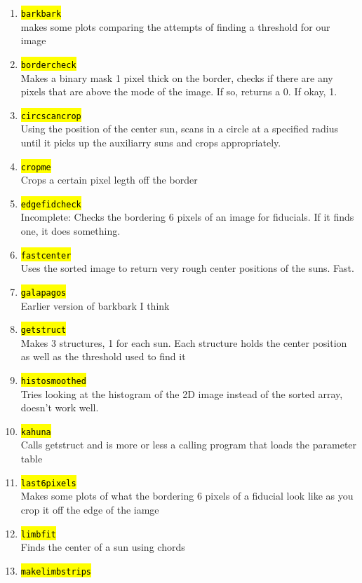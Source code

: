 \documentclass[10pt]{article}
\begin{document}
\begin{enumerate}
	\item \hl{\texttt{barkbark}}\\
		makes some plots comparing the attempts of finding a threshold for our image
	\item \hl{\texttt{bordercheck}}\\
		Makes a binary mask 1 pixel thick on the border, checks if there are any pixels that are above the mode of the image. If so, returns a 0. If okay, 1.
	\item \hl{\texttt{circscancrop}}\\
		Using the position of the center sun, scans in a circle at a specified radius until it picks up the auxiliarry suns and crops appropriately.
	\item \hl{\texttt{cropme}}\\
		Crops a certain pixel legth off the border
	\item \hl{\texttt{edgefidcheck}}\\
		Incomplete: Checks the bordering 6 pixels of an image for fiducials. If it finds one, it does something.
	\item \hl{\texttt{fastcenter}}\\
		Uses the sorted image to return very rough center positions of the suns. Fast.
	\item \hl{\texttt{galapagos}}\\
		Earlier version of barkbark I think
	\item \hl{\texttt{getstruct}}\\
		Makes 3 structures, 1 for each sun. Each structure holds the center position as well as the threshold used to find it
	\item \hl{\texttt{histosmoothed}}\\
		Tries looking at the histogram of the 2D image instead of the sorted array, doesn't work well.
	\item \hl{\texttt{kahuna}}\\
		Calls getstruct and is more or less a calling program that loads the parameter table
	\item \hl{\texttt{last6pixels}}\\
		Makes some plots of what the bordering 6 pixels of a fiducial look like as you crop it off the edge of the iamge
	\item \hl{\texttt{limbfit}}\\
		Finds the center of a sun using chords
	\item \hl{\texttt{makelimbstrips}}\\

\end{enumerate}
\end{document}
